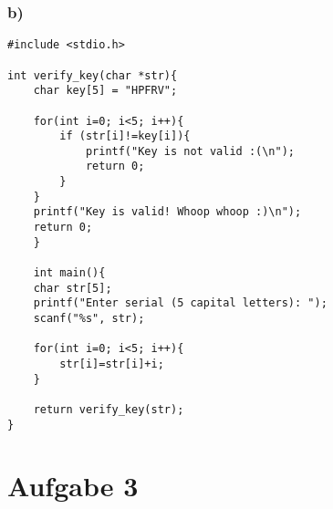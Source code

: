 \documentclass[]{scrreprt}
\begin{document}
	\subsection*{b)}
	\begin{lstlisting}[caption={Crackme-Code},captionpos=b]
#include <stdio.h>

int verify_key(char *str){
	char key[5] = "HPFRV";
	
	for(int i=0; i<5; i++){
		if (str[i]!=key[i]){
			printf("Key is not valid :(\n");
			return 0;
		}
	}
	printf("Key is valid! Whoop whoop :)\n");
	return 0;
	}
	
	int main(){
	char str[5];
	printf("Enter serial (5 capital letters): ");
	scanf("%s", str);
	
	for(int i=0; i<5; i++){
		str[i]=str[i]+i;
	}
	
	return verify_key(str);
}
\end{lstlisting}
\chapter{Aufgabe 3}
\end{document}
